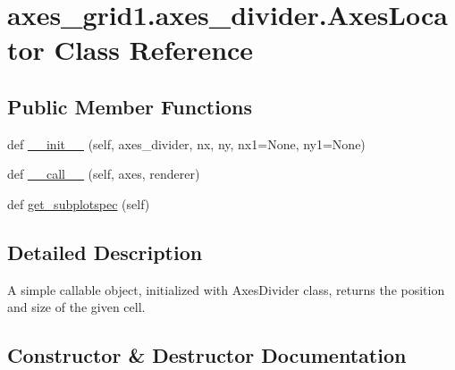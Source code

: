 \hypertarget{classaxes__grid1_1_1axes__divider_1_1AxesLocator}{}\section{axes\+\_\+grid1.\+axes\+\_\+divider.\+Axes\+Locator Class Reference}
\label{classaxes__grid1_1_1axes__divider_1_1AxesLocator}
\subsection*{Public Member Functions}
\begin{DoxyCompactItemize}
\item 
def \hyperlink{classaxes__grid1_1_1axes__divider_1_1AxesLocator_abc31752943eb2fa2ff2b20da35a9cd56}{\+\_\+\+\_\+init\+\_\+\+\_\+} (self, axes\+\_\+divider, nx, ny, nx1=None, ny1=None)
\item 
def \hyperlink{classaxes__grid1_1_1axes__divider_1_1AxesLocator_a6ba24781359fae61a2dac10a2902fa9c}{\+\_\+\+\_\+call\+\_\+\+\_\+} (self, axes, renderer)
\item 
def \hyperlink{classaxes__grid1_1_1axes__divider_1_1AxesLocator_a8a4e7a3a9aa76e65993c41b78a3b850b}{get\+\_\+subplotspec} (self)
\end{DoxyCompactItemize}


\subsection{Detailed Description}
\begin{DoxyVerb}A simple callable object, initialized with AxesDivider class,
returns the position and size of the given cell.
\end{DoxyVerb}
 

\subsection{Constructor \& Destructor Documentation}
\mbox{\label{classaxes__grid1_1_1axes__divider_1_1AxesLocator_abc31752943eb2fa2ff2b20da35a9cd56}} 
